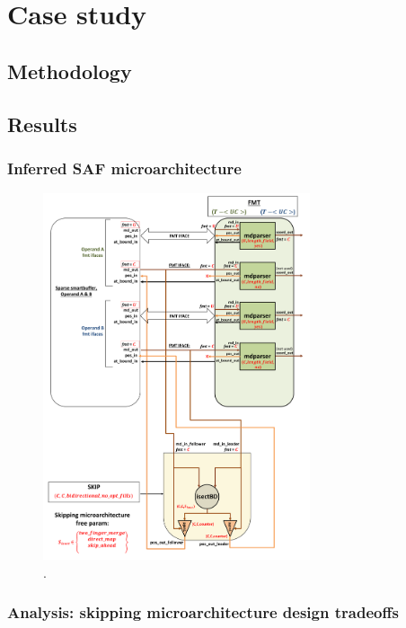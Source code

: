 \chapter{Case study}
\label{chapter:case_studies}

\section{Methodology}

\section{Results}

\subsection{Inferred SAF microarchitecture}

\begin{figure}[ht]
\centering
\includegraphics[width=0.7\textwidth]{figures/case_study_inferred_uarch.pdf}
\caption{.}
\label{fig:case_study_inferred_uarch}
\end{figure}

\clearpage

\subsection{Analysis: skipping microarchitecture design tradeoffs}

